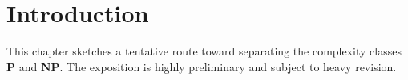 
\section{Introduction}\label{P:intro}

This chapter sketches a tentative route toward separating the complexity
classes \(\mathbf P\) and \(\mathbf{NP}\).  The exposition is highly
preliminary and subject to heavy revision.
